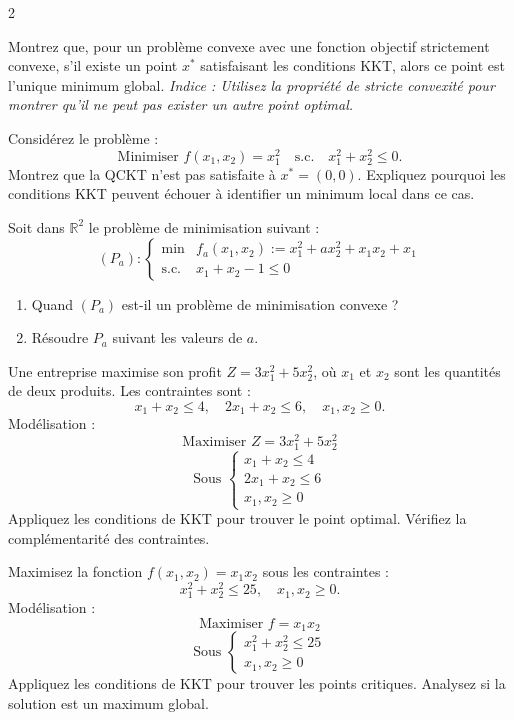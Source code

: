 \begin{multicols}{2}
\begin{exercice}
	Montrez que, pour un problème convexe avec une fonction objectif strictement convexe, s'il existe un point \( x^* \) satisfaisant les conditions KKT, alors ce point est l'unique minimum global. \textit{Indice : Utilisez la propriété de stricte convexité pour montrer qu'il ne peut pas exister un autre point optimal.}
\end{exercice}

\begin{exercice}
	Considérez le problème :
	\[
	\text{Minimiser } f(x_1, x_2) = x_1^2 \quad \text{s.c.} \quad x_1^2 + x_2^2 \leq 0.
	\]
	Montrez que la QCKT n'est pas satisfaite à \( x^* = (0, 0) \). Expliquez pourquoi les conditions KKT peuvent échouer à identifier un minimum local dans ce cas.
\end{exercice}

\begin{exercice}
	Soit dans \( \mathbb{R}^2 \) le problème de minimisation suivant :
	\[
	(P_a) :
	\left\lbrace \begin{array}{ll}
	\min & f_a(x_1, x_2) := x_1^2 + a x_2^2 + x_1x_2 + x_1 \\
	\text{s.c.} & x_1 + x_2 - 1 \leq 0
	\end{array}\right.
	\]
	\begin{enumerate}[label=\arabic*.,leftmargin=*]
		\item Quand \( (P_a) \) est-il un problème de minimisation convexe ?
		\item Résoudre \( P_a \) suivant les valeurs de \( a \).
	\end{enumerate}
\end{exercice}

\begin{exercice}
	Une entreprise maximise son profit \( Z = 3x_1^2 + 5x_2^2 \), où \( x_1 \) et \( x_2 \) sont les quantités de deux produits. Les contraintes sont :
	\[
	x_1 + x_2 \leq 4, \quad 2x_1 + x_2 \leq 6, \quad x_1, x_2 \geq 0.
	\]
	Modélisation :
	\[
	\text{Maximiser } Z = 3x_1^2 + 5x_2^2
	\]
	\[
	\text{Sous } \begin{cases}
	x_1 + x_2 \leq 4 \\
	2x_1 + x_2 \leq 6 \\
	x_1, x_2 \geq 0
	\end{cases}
	\]
	Appliquez les conditions de KKT pour trouver le point optimal. Vérifiez la complémentarité des contraintes.
\end{exercice}

\begin{exercice}
	Maximisez la fonction \( f(x_1, x_2) = x_1 x_2 \) sous les contraintes :
	\[
	x_1^2 + x_2^2 \leq 25, \quad x_1, x_2 \geq 0.
	\]
	Modélisation :
	\[
	\text{Maximiser } f = x_1 x_2
	\]
	\[
	\text{Sous } \begin{cases}
	x_1^2 + x_2^2 \leq 25 \\
	x_1, x_2 \geq 0
	\end{cases}
	\]
	Appliquez les conditions de KKT pour trouver les points critiques. Analysez si la solution est un maximum global.
\end{exercice}


\end{multicols}

